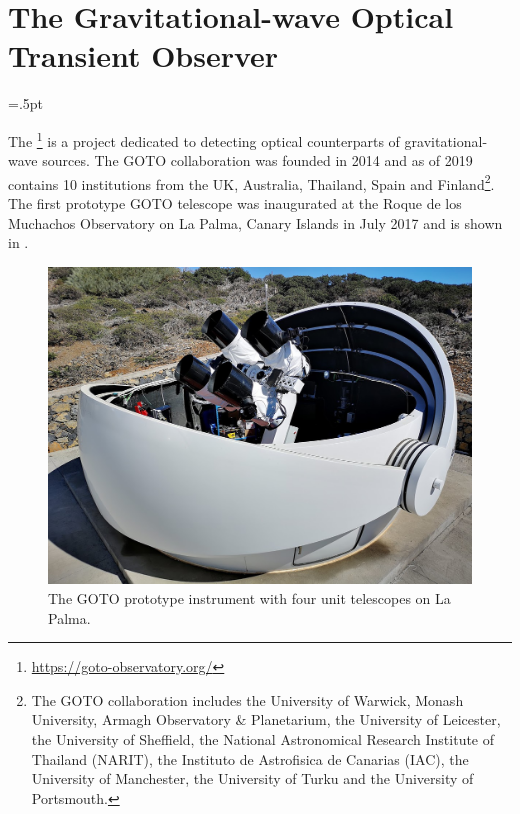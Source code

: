 \section{The Gravitational-wave Optical Transient Observer}
\hfuzz=.5pt %
\label{sec:goto}
\begin{colsection}


\begin{colsection}

The \footnote{\url{https://goto-observatory.org/}} is a project dedicated to detecting optical counterparts of gravitational-wave sources. The GOTO collaboration was founded in 2014 and as of 2019 contains 10 institutions from the UK, Australia, Thailand, Spain and Finland\footnote{The GOTO collaboration includes the University of Warwick, Monash University, Armagh Observatory \& Planetarium, the University of Leicester, the University of Sheffield, the National Astronomical Research Institute of Thailand (NARIT), the Instituto de Astrofisica de Canarias (IAC), the University of Manchester, the University of Turku and the University of Portsmouth.}. The first prototype GOTO telescope was inaugurated at the Roque de los Muchachos Observatory on La Palma, Canary Islands in July 2017 and is shown in .

\begin{figure}[p]
    \begin{center}
        \includegraphics[width=0.9\linewidth]{images/goto_photo.jpg}
    \end{center}
    \caption[The GOTO prototype instrument]{
        The GOTO prototype instrument with four unit telescopes on La Palma.
    }\label{fig:goto_photo}
\end{figure}


\end{colsection}
\end{colsection}
